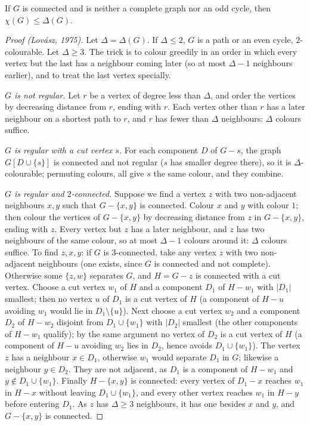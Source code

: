 \begin{theorem}[Brooks, 1941]\label{thm:brooks}
If $G$ is connected and is neither a complete graph nor an odd cycle, then $\chi(G)\le\Delta(G)$.
\end{theorem}
\begin{proof}[Proof (Lov\'asz, 1975)]
Let $\Delta=\Delta(G)$. If $\Delta\le2$, $G$ is a path or an even cycle, $2$-colourable. Let $\Delta\ge3$. The trick is to colour greedily in an order in which every vertex but the
last has a neighbour coming later (so at most $\Delta-1$ neighbours earlier), and to treat the last vertex specially.

\emph{$G$ is not regular.} Let $r$ be a vertex of degree less than $\Delta$, and order the vertices by decreasing distance from $r$, ending with $r$. Each vertex other than $r$
has a later neighbour on a shortest path to $r$, and $r$ has fewer than $\Delta$ neighbours: $\Delta$ colours suffice.

\emph{$G$ is regular with a cut vertex $s$.} For each component $D$ of $G-s$, the graph $G[D\cup\{s\}]$ is connected and not regular ($s$ has smaller degree there), so it is
$\Delta$-colourable; permuting colours, all give $s$ the same colour, and they combine.

\emph{$G$ is regular and $2$-connected.} Suppose we find a vertex $z$ with two non-adjacent neighbours $x,y$ such that $G-\{x,y\}$ is connected. Colour $x$ and $y$ with colour $1$;
then colour the vertices of $G-\{x,y\}$ by decreasing distance from $z$ in $G-\{x,y\}$, ending with $z$. Every vertex but $z$ has a later neighbour, and $z$ has two
neighbours of the same colour, so at most $\Delta-1$ colours around it: $\Delta$ colours suffice. To find $z,x,y$: if $G$ is $3$-connected, take any vertex $z$ with two non-adjacent
neighbours (one exists, since $G$ is connected and not complete). Otherwise some $\{z,w\}$ separates $G$, and $H=G-z$ is connected with a cut vertex. Choose a cut vertex $w_1$ of
$H$ and a component $D_1$ of $H-w_1$ with $|D_1|$ smallest; then no vertex $u$ of $D_1$ is a cut vertex of $H$ (a component of $H-u$ avoiding $w_1$ would lie in $D_1\setminus\{u\}$). Next
choose a cut vertex $w_2$ and a component $D_2$ of $H-w_2$ disjoint from $D_1\cup\{w_1\}$ with $|D_2|$ smallest (the other components of $H-w_1$ qualify); by the same argument no
vertex of $D_2$ is a cut vertex of $H$ (a component of $H-u$ avoiding $w_2$ lies in $D_2$, hence avoids $D_1\cup\{w_1\}$). The vertex $z$ has a neighbour $x\in D_1$, otherwise $w_1$ would
separate $D_1$ in $G$; likewise a neighbour $y\in D_2$. They are not adjacent, as $D_1$ is a component of $H-w_1$ and $y\notin D_1\cup\{w_1\}$. Finally $H-\{x,y\}$ is connected: every vertex of
$D_1-x$ reaches $w_1$ in $H-x$ without leaving $D_1\cup\{w_1\}$, and every other vertex reaches $w_1$ in $H-y$ before entering $D_1$. As $z$ has $\Delta\ge3$ neighbours, it has one
besides $x$ and $y$, and $G-\{x,y\}$ is connected.
\end{proof}

